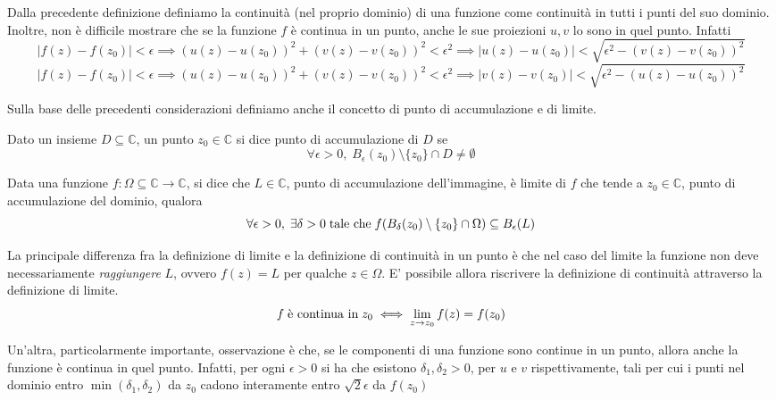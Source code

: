         Dalla precedente definizione definiamo la continuità (nel proprio dominio) di una funzione come continuità in tutti i punti del suo dominio.
        Inoltre, non è difficile mostrare che se la funzione $f$ è continua in un punto, anche le sue proiezioni $u, v$ lo sono in quel punto.
        Infatti
        \[
            |f(z) - f(z_{0})| < \epsilon \implies (u(z) - u(z_{0}))^{2} + (v(z) - v(z_{0}))^{2} < \epsilon^{2} \implies |u(z) - u(z_{0})| < \sqrt{\epsilon^{2} - (v(z) - v(z_{0}))^{2}}
        \]
        \[
            |f(z) - f(z_{0})| < \epsilon \implies (u(z) - u(z_{0}))^{2} + (v(z) - v(z_{0}))^{2} < \epsilon^{2} \implies |v(z) - v(z_{0})| < \sqrt{\epsilon^{2} - (u(z) - u(z_{0}))^{2}}
        \]

        Sulla base delle precedenti considerazioni definiamo anche il concetto di punto di accumulazione e di limite.

        \begin{definition}
            Dato un insieme $D \subseteq \mathbb{C}$, un punto $z_{0} \in \mathbb{C}$ si dice punto di accumulazione di $D$ se
            \[
                \forall \epsilon > 0, \; B_{\epsilon}(z_{0}) \setminus \{z_{0}\} \cap D \neq \emptyset
            \]
        \end{definition}

        \begin{definition}[Limite]
            Data una funzione $f: \Omega \subseteq \mathbb{C} \rightarrow \mathbb{C}$, si dice che $L \in \mathbb{C}$, punto di accumulazione dell'immagine, è limite di $f$ che tende a $z_{0} \in \mathbb{C}$, punto di accumulazione del dominio, qualora
            \[
                \forall \epsilon > 0, \; \exists \delta > 0 \; \textnormal{tale che} \; f(B_{\delta}(z_{0}) \setminus \{z_{0}\} \cap \Omega) \subseteq B_{\epsilon}(L)
            \]
        \end{definition}

        La principale differenza fra la definizione di limite e la definizione di continuità in un punto è che nel caso del limite la funzione non deve necessariamente \textit{raggiungere} $L$, ovvero $f(z) = L$ per qualche $z \in \Omega$.
        E' possibile allora riscrivere la definizione di continuità attraverso la definizione di limite.
        \[
            f \; \textnormal{è continua in} \; z_{0} \iff \lim_{z \rightarrow z_{0}} f(z) = f(z_{0})
        \]

        Un'altra, particolarmente importante, osservazione è che, se le componenti di una funzione sono continue in un punto, allora anche la funzione è continua in quel punto.
        Infatti, per ogni $\epsilon > 0$ si ha che esistono $\delta_{1}, \delta_{2} > 0$, per $u$ e $v$ rispettivamente, tali per cui i punti nel dominio entro $\min(\delta_{1}, \delta_{2})$ da $z_{0}$ cadono interamente entro $\sqrt{2} \epsilon$ da $f(z_{0})$


